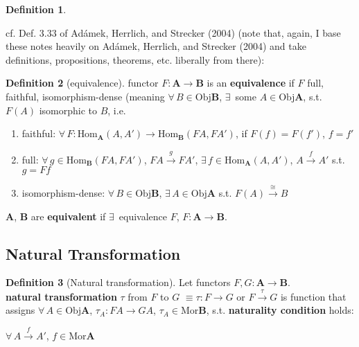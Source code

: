 \documentclass[twoside,landscape,10pt]{amsart}
\theoremstyle{plain}
\theoremstyle{definition}
\newtheorem{definition}{Definition}
\theoremstyle{remark}
\begin{document}
\begin{multicols*}{2}
\begin{definition}
\end{definition}


cf. Def. 3.33 of Ad\'{a}mek, Herrlich, and Strecker (2004) \cite{AHS2004} (note that, again, I base these notes heavily on Ad\'{a}mek, Herrlich, and Strecker (2004) and take definitions, propositions, theorems, etc. liberally from there): 
\begin{definition}[equivalence]
  functor $F: \mathbf{A} \to \mathbf{B}$ is an \textbf{equivalence} if $F$ full, faithful, isomorphism-dense (meaning $\forall \, B \in \text{Obj}\mathbf{B}$, $\exists \, $ some $A \in \text{Obj}\mathbf{A}$, s.t. $F(A)$ isomorphic to $B$, i.e. 
\begin{enumerate}
  \item faithful: $\forall \, F:\text{Hom}_{\mathbf{A}}(A,A') \to \text{Hom}_{\mathbf{B}}(FA,FA')$, if $F(f) = F(f')$, $f=f'$ 
  \item full: $\forall \, g \in \text{Hom}_{\mathbf{B}}(FA,FA')$, $FA \xrightarrow{g} FA'$, $\exists \, f \in \text{Hom}_{\mathbf{A}}(A,A')$, $A\xrightarrow{f} A'$ s.t. $g=Ff$
  \item isomorphism-dense: $\forall \, B \in \text{Obj}\mathbf{B}$, $\exists \, A \in \text{Obj}\mathbf{A}$ s.t. $F(A) \xrightarrow{ \cong}B$
\end{enumerate}

$\mathbf{A}$, $\mathbf{B}$ are \textbf{equivalent} if $\exists \, $ equivalence $F$, $F:\mathbf{A}\to \mathbf{B}$.  
\end{definition}


\subsection{Natural Transformation}

\begin{definition}[Natural transformation]
  Let functors $F,G : \mathbf{A} \to \mathbf{B}$.  \\
\textbf{natural transformation} $\tau$ from $F$ to $G$ $\equiv \tau : F\to G$ or $F\xrightarrow{ \tau} G$ is function that assigns $\forall \, A \in \text{Obj}\mathbf{A}$, $\tau_A:FA \to GA$, $\tau_A \in \text{Mor}\mathbf{B}$, s.t. \textbf{naturality condition} holds:

$\forall \, A \xrightarrow{f} A'$, $f\in \text{Mor}\mathbf{A}$



\end{definition}
\end{multicols*}
\end{document}
